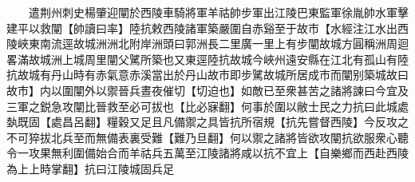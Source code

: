 　　遣荆州刺史楊肇迎闡於西陵車騎將軍羊祜帥步軍出江陵巴東監軍徐胤帥水軍擊建平以救闡【帥讀曰率】陸抗敕西陵諸軍築嚴圍自赤谿至于故市【水經注江水出西陵峽東南流逕故城洲洲北附岸洲頭曰郭洲長二里廣一里上有步闡故城方圓稱洲周迴畧滿故城洲上城周里闡父騭所築也又東逕陸抗故城今峽州遠安縣在江北有孤山有陸抗故城有丹山時有赤氣意赤溪當出於丹山故市即步騭故城所居成市而闡别築城故曰故市】内以圍闡外以禦晉兵晝夜催切【切迫也】如敵已至衆甚苦之諸將諫曰今宜及三軍之鋭急攻闡比晉救至必可拔也【比必寐翻】何事於圍以敝士民之力抗曰此城處埶既固【處昌呂翻】糧穀又足且凡備禦之具皆抗所宿規【抗先嘗督西陵】今反攻之不可猝拔北兵至而無備表裏受難【難乃旦翻】何以禦之諸將皆欲攻闡抗欲服衆心聽令一攻果無利圍備始合而羊祜兵五萬至江陵諸將咸以抗不宜上【自樂鄉而西赴西陵為上上時掌翻】抗曰江陵城固兵足